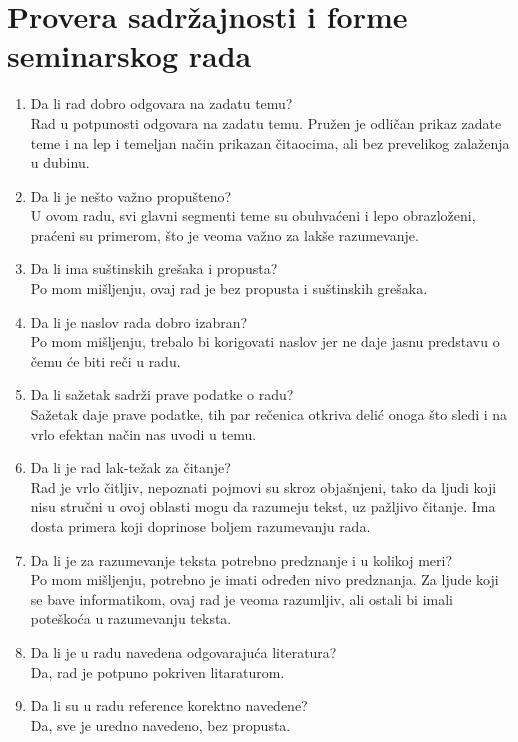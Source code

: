 \documentclass[a4paper]{report}
\begin{document}
\section{Provera sadržajnosti i forme seminarskog rada}

\begin{enumerate}
\item Da li rad dobro odgovara na zadatu temu?\\
Rad u potpunosti odgovara na zadatu temu. Pružen je odličan prikaz zadate teme i na lep i temeljan način prikazan čitaocima, ali bez prevelikog zalaženja u dubinu.
\item Da li je nešto važno propušteno?\\
U ovom radu, svi glavni segmenti teme su obuhvaćeni i lepo obrazloženi, praćeni su primerom, što je veoma važno za lakše razumevanje.
\item Da li ima suštinskih grešaka i propusta?\\
Po mom mišljenju, ovaj rad je bez propusta i suštinskih grešaka.
\item Da li je naslov rada dobro izabran?\\
Po mom mišljenju, trebalo bi korigovati naslov jer ne daje jasnu predstavu o čemu će biti reči u radu. 
\item Da li sažetak sadrži prave podatke o radu?\\
Sažetak daje prave podatke, tih par rečenica otkriva delić onoga što sledi  i na vrlo efektan način nas uvodi u temu. 
\item Da li je rad lak-težak za čitanje?\\
Rad je vrlo čitljiv, nepoznati pojmovi su skroz objašnjeni, tako da ljudi koji nisu stručni u ovoj oblasti mogu da razumeju tekst, uz pažljivo čitanje. Ima dosta primera koji doprinose boljem razumevanju rada.
\item Da li je za razumevanje teksta potrebno predznanje i u kolikoj meri?\\
Po mom mišljenju, potrebno je imati određen nivo predznanja. Za ljude koji se bave informatikom, ovaj rad je veoma razumljiv, ali ostali bi imali poteškoća u razumevanju teksta.
\item Da li je u radu navedena odgovarajuća literatura?\\
Da, rad je potpuno pokriven litaraturom.
\item Da li su u radu reference korektno navedene?\\
Da, sve je uredno navedeno, bez propusta.

\end{enumerate}
\end{document}
